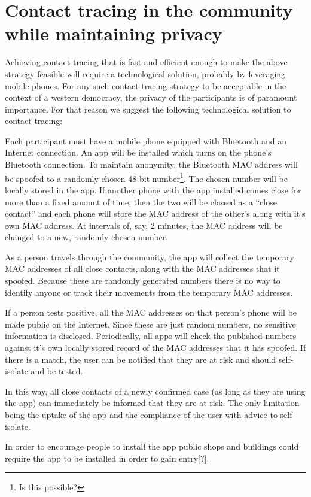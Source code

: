 \documentclass{article}
\begin{document}
\section{Contact tracing in the community while maintaining privacy}

Achieving contact tracing that is fast and efficient enough to make the above strategy feasible will require a technological solution, probably by leveraging mobile phones. For any such contact-tracing strategy to be acceptable in the context of a western democracy, the privacy of the participants is of paramount importance. For that reason we suggest the following technological solution to contact tracing:

Each participant must have a mobile phone equipped with Bluetooth and an Internet connection. An app will be installed which turns on the phone's Bluetooth connection. To maintain anonymity, the Bluetooth MAC address will be spoofed to a randomly chosen 48-bit number\footnote{Is this possible?}. The chosen number will be locally stored in the app. If another phone with the app installed comes close for more than a fixed amount of time, then the two will be classed as a ``close contact'' and each phone will store the MAC address of the other's along with it's own MAC address. At intervals of, say, 2 minutes, the MAC address will be changed to a new, randomly chosen number.

As a person travels through the community, the app will collect the temporary MAC addresses of all close contacts, along with the MAC addresses that it spoofed. Because these are randomly generated numbers there is no way to identify anyone or track their movements from the temporary MAC addresses.

If a person tests positive, all the MAC addresses on that person's phone will be made public on the Internet. Since these are just random numbers, no sensitive information is disclosed. Periodically, all apps will check the published numbers against it's own locally stored record of the MAC addresses that it has spoofed. If there is a match, the user can be notified that they are at risk and should self-isolate and be tested.

In this way, all close contacts of a newly confirmed case (as long as they are using the app) can immediately be informed that they are at risk. The only limitation being the uptake of the app and the compliance of the user with advice to self isolate.

In order to encourage people to install the app public shops and buildings could require the app to be installed in order to gain entry[?].
\end{document}
